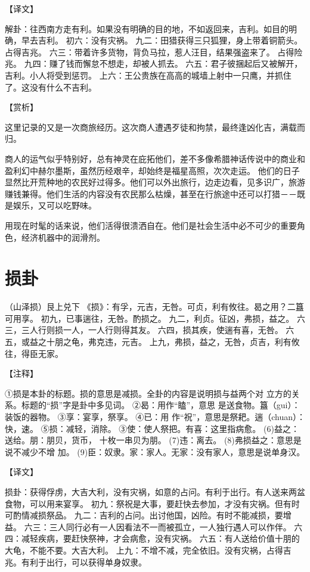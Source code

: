 \documentclass[12pt,UTF8]{ctexbook}
\begin{document}
【译文】

解卦：往西南方走有利。如果没有明确的目的地，不如返回来，吉利。如目的明确，早去吉利。
初六：没有灾祸。
九二：田猎获得三只狐狸，身上带着铜箭头。占得吉兆。
六三：带着许多货物，背负马拉，惹人汪目，结果强盗来了。 占得险兆。
九四：赚了钱而懈怠不想走，却被人抓去。
六五：君子彼捆起后又被解开，吉利。小人将受到惩罚。
上六：王公贵族在高高的城墙上射中一只鹰，并抓住了。这没有什么不吉利。

【赏析】

这里记录的又是一次商旅经历。这次商人遭遇歹徒和拘禁，最终逢凶化吉，满载而归。

商人的运气似乎特别好，总有神灵在庇拓他们，差不多像希腊神话传说中的商业和盈利幻中赫尔墨斯，虽然历经艰辛，却始终是福星高照，次次走运。 他们的日子显然比开荒种地的农民好过得多。他们可以外出旅行，边走边看，见多识广，旅游赚钱兼得。他们生活的内容没有农民那么枯燥，甚至在行旅途中还可以打猎－－既是娱乐，又可以吃野味。

用现在时髦的话来说，他们活得很溃洒自在。他们是社会生活中必不可少的重要角色，经济机器中的润滑剂。

\chapter{损卦}

（山泽损）艮上兑下
《损》：有孚，元吉，无咎。可贞，利有攸往。曷之用？二簋可用享。
初九，已事遄往，无咎。酌损之。
九二，利贞。征凶，弗损，益之。
六三，三人行则损一人，一人行则得其友。
六四，损其疾，使遄有喜，无咎。
六五，或益之十朋之龟，弗克违，元吉。
上九，弗损，益之，无咎，贞吉，利有攸往，得臣无家。

【注释】

①损是本卦的标题。损的意思是减损。全卦的内容是说明损与益两个对 立方的关系。标题的“损”字是卦中多见词。
②曷：用作“瞌”，意思 是送食物。簋（gui）：装饭的器物。
③享：宴享，祭享。
④已：用 作“祝”，意思是祭耙。遄（chuan）：快，速。
⑤损：减轻，消除。
③使：使人祭把。有喜：这里指病愈。
(6)益之：送给。朋：朋贝，货币， 十枚一串贝为朋。
(7)违：离去。
(8)弗损益之：意思是说不减少不增 加。
(9)臣：奴隶。家：家人。无家：没有家人，意思是说单身汉。

【译文】

损卦：获得俘虏，大吉大利，没有灾祸，如意的占问。有利于出行。有人送来两盆食物，可以用来宴享。
初九：祭祝是大事，要赶快去参加，才没有灾祸。但有时可酌情减损祭品。
九二：吉利的占问。出讨他国，凶险。有时不能减损，要增益。
六三：三人同行必有一人因看法不一而被孤立，一人独行遇人可以作伴。
六四：减轻疾病，要赶快祭神，才会病愈，没有灾祸。
六五：有人送给价值十朋的大龟，不能不要。大吉大利。
上九：不增不减，完全依旧。没有灾祸，占得吉兆。有利于出行，可以获得单身奴隶。
\end{document}

